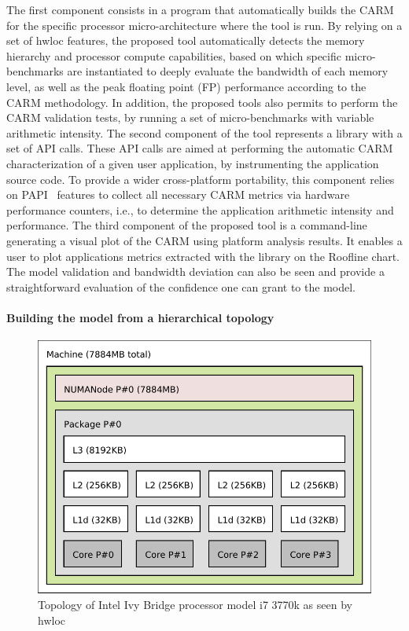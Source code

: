 \documentclass[twoside,twocolumn,8pt]{extarticle}
\begin{document}
The first component consists in a program that automatically  builds the CARM for the specific processor micro-architecture where
the tool is run. By relying on a set of hwloc features, the proposed tool automatically detects the memory hierarchy and processor
compute capabilities, based on which specific micro-benchmarks are instantiated to deeply evaluate the bandwidth of each memory
level,  as well as the peak floating point (FP) performance according to the CARM methodology.
In addition, the proposed tools also permits to perform the CARM validation tests, by running a set of micro-benchmarks with
variable arithmetic intensity. 
The second component of the tool represents  a library with a set of API calls. These API calls are aimed at performing the
automatic CARM characterization of a given user application, by instrumenting the application source code.
To provide a wider cross-platform portability, this component relies on PAPI~\cite{dolog2003integrating} features to collect all
necessary CARM metrics via hardware performance counters, i.e., to determine the application arithmetic intensity and performance.
The third component of the proposed tool is a command-line generating a visual plot of the CARM using platform analysis results. It
enables a user to plot applications metrics extracted with the library on the Roofline chart. The model validation and bandwidth
deviation can also be seen and provide a straightforward evaluation of the confidence one can grant to the model.

\paragraph*{Building the model from a hierarchical topology}

\begin{figure}
  \includegraphics[width=.5\textwidth]{pictures/i7_3770k.pdf}
  \caption{Topology of Intel Ivy Bridge processor model i7 3770k as seen by hwloc}
  \label{fig:topology_adriana}
\end{figure}
\end{document}
